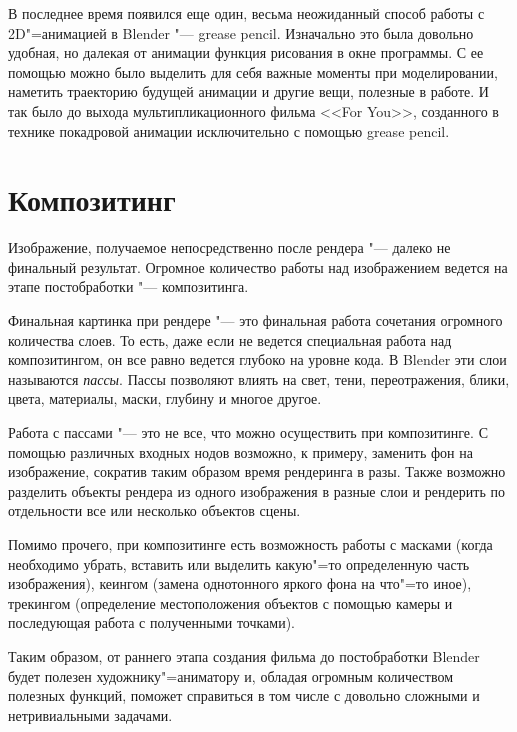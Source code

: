 \documentclass[10pt, a5paper]{article}
\begin{document}
В последнее время появился еще один, весьма неожиданный способ работы с 2D"=анимацией в Blender "--- grease pencil. Изначально это была довольно удобная, но далекая от анимации функция рисования в окне программы. С ее помощью можно было выделить для себя важные моменты при моделировании, наметить траекторию будущей анимации и другие вещи, полезные в работе. И так было до выхода мультипликационного фильма <<For You>>, созданного в технике покадровой анимации исключительно с помощью grease pencil.

\section*{Композитинг}

Изображение, получаемое непосредственно после рендера "--- далеко не финальный результат. Огромное количество работы над изображением ведется на этапе постобработки "--- композитинга.

Финальная картинка при рендере "--- это финальная работа сочетания огромного количества слоев. То есть, даже если не ведется специальная работа над композитингом, он все равно ведется глубоко на уровне кода. В Blender эти слои называются \emph{пассы}.  Пассы позволяют влиять на свет, тени, переотражения, блики, цвета, материалы, маски, глубину и многое другое.

Работа с пассами "--- это не все, что можно осуществить при композитинге. С помощью различных входных нодов возможно, к примеру, заменить фон на изображение, сократив таким образом время рендеринга в разы. Также возможно разделить объекты рендера из одного изображения в разные слои и рендерить по отдельности все или несколько объектов сцены.

Помимо прочего, при композитинге есть возможность работы с масками (когда необходимо убрать, вставить или выделить какую"=то определенную часть изображения), кеингом (замена однотонного яркого фона на что"=то иное), трекингом (определение  местоположения объектов с помощью камеры и последующая работа с полученными точками).

Таким образом, от раннего этапа создания фильма до постобработки Blender будет полезен художнику"=аниматору и, обладая огромным количеством полезных функций, поможет справиться в том числе с довольно сложными и нетривиальными задачами.
\end{document}
